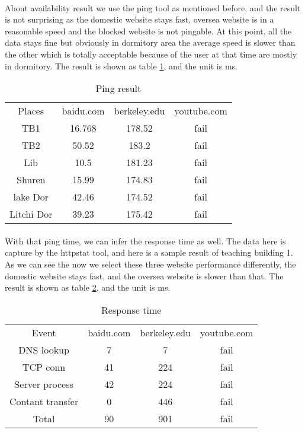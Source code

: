 \documentclass[paper=a4, fontsize=11pt]{scrartcl}
\numberwithin{equation}{section}
\numberwithin{figure}{section}
\numberwithin{table}{section}
\begin{document}
\paragraph{}
About availability result we use the ping tool as mentioned before, and the result is not surprising as the domestic website stays fast, oversea website is in a reasonable speed and the blocked website is not pingable. At this point, all the data stays fine but obviously in dormitory area the average speed is slower than the other which is totally acceptable because of the user at that time are mostly in dormitory. The result is shown as table \ref{tab:c1}, and the unit is ms.
\begin{table}[htbp]
  \centering
  \caption{Ping result}
    \begin{tabular}{cccc}
    Places    & \multicolumn{1}{l}{baidu.com} & \multicolumn{1}{l}{berkeley.edu} & youtube.com \\
    TB1   & 16.768 & 178.52 & fail \\
    TB2   & 50.52 & 183.2 & fail \\
    Lib   & 10.5  & 181.23 & fail \\
    Shuren & 15.99 & 174.83 & fail \\
    lake Dor & 42.46 & 174.52 & fail \\
    Litchi Dor  & 39.23 & 175.42 & fail \\
    \end{tabular}%
  \label{tab:c1}%
\end{table}%
\paragraph{}
With that ping time, we can infer the response time as well. The data here is capture by the httpstat tool, and here is a sample result of teaching building 1. As we can see the now we select these three website performance differently, the domestic website stays fast, and the oversea website is slower than that. The result is shown as table \ref{tab:c2}, and the unit is ms.
\begin{table}[htbp]
  \centering
  \caption{Response time}
    \begin{tabular}{cccc}
    Event    & baidu.com & berkeley.edu & youtube.com \\
    DNS lookup & 7     & 7     & fail \\
    TCP conn & 41    & 224   & fail \\
    Server process & 42    & 224   & fail \\
    Contant transfer & 0     & 446   & fail \\
    Total & 90    & 901   & fail \\
    \end{tabular}%
  \label{tab:c2}%
\end{table}%
\end{document}
